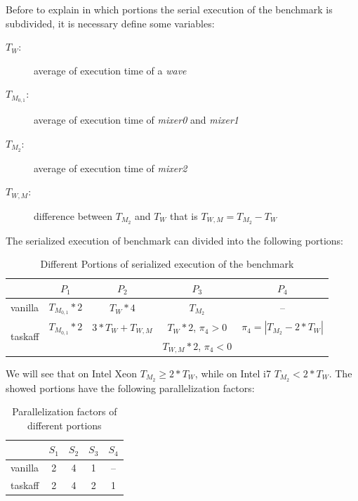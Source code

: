 Before to explain in which portions the serial execution of the benchmark is subdivided, it is necessary define some variables:

\begin{description}
\item[$T_{W}$:] average of execution time of a \textit{wave}
\item[$T_{M_{0,1}}$:] average of execution time of \textit{mixer0} and \textit{mixer1}
\item[$T_{M_{2}}$:] average of execution time of \textit{mixer2}
\item[$T_{W,M}$:] difference between $T_{M_{2}}$ and $T_{W}$ that is $T_{W,M} = T_{M_{2}} - T_{W}$
\end{description}

The serialized execution of benchmark can divided into the following portions:

\begin{table}[htbp]
\begin{center}
\begin{tabular}{|l|c|c|c|c|} \hline
& $P_{1}$ & $P_{2}$ & $P_{3}$ & $P_{4}$ \\ \hline
vanilla & $T_{M_{0,1}}*2$ & $T_{W}*4$ & $T_{M_{2}}$ & -- \\ \hline
\multirow{2}{*}{taskaff} & {$T_{M_{0,1}}*2$} & $3*T_{W} + T_{W,M}$ & $T_{W}*2$, $\pi_{4} > 0$ & $\pi_{4} = |T_{M_{2}} - 2*T_{W}|$ \\
& & & $T_{W,M}*2$, $\pi_{4} < 0$ & \\  \hline
\end{tabular}
\caption{Different Portions of serialized execution of the benchmark}
\label{tab:portions_van_tsk}
\end{center}
\end{table}

We will see that on Intel Xeon $T_{M_{2}} \ge 2*T_{W}$, while on Intel i7 $T_{M_{2}} < 2*T_{W}$. The showed portions have the following
parallelization factors:

\begin{table}[htbp]
\begin{center}
\begin{tabular}{|l|c|c|c|c|} \hline
& $S_{1}$ & $S_{2}$ & $S_{3}$ & $S_{4}$ \\ \hline
vanilla & 2 & 4 & 1 & --\\ \hline
taskaff & 2 & 4 & 2 & 1 \\ \hline
\end{tabular}
\caption{Parallelization factors of different portions}
\label{tab:speedups_van_tsk}
\end{center}
\end{table}

